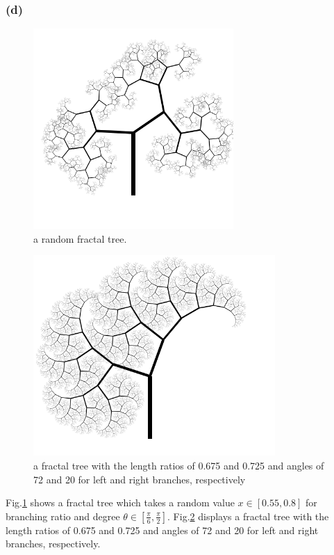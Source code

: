 \documentclass{article}
\begin{document}
\subsubsection*{(d)}
\begin{figure}[hb]
	\centering
	\includegraphics[height=3in]{figs/fractal-tree_rand1.png}
	\caption{a random fractal tree.}
	\label{fractal_tree_rand}
\end{figure}

\begin{figure}[hb]
	\centering
	\includegraphics[height=3in]{figs/fractal-tree_interesting.png}
	\caption{a fractal tree with the length ratios of 0.675 and 0.725 and angles of 72 and 20 for left and right branches, respectively}
	\label{fractal_tree_interesting}
\end{figure}

Fig.\ref{fractal_tree_rand} shows a fractal tree which takes a random value $x \in [0.55, 0.8]$ for branching ratio and degree $\theta \in [\frac{\pi}{6}, \frac{\pi}{2}]$. Fig.\ref{fractal_tree_interesting} displays a fractal tree with the length ratios of 0.675 and 0.725 and angles of 72 and 20 for left and right branches, respectively.
\end{document}
